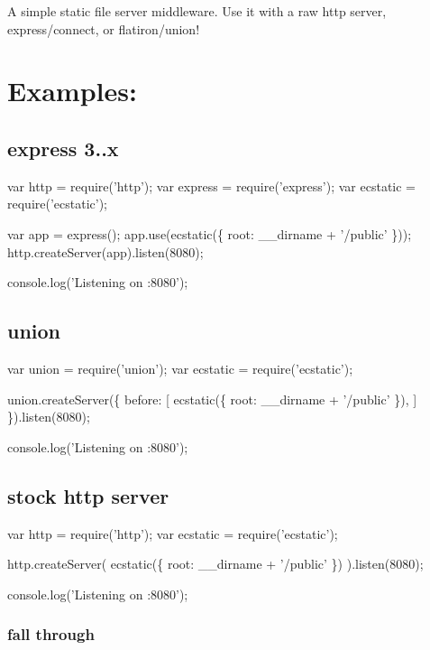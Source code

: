 

A simple static file server middleware. Use it with a raw http server, express/connect, or flatiron/union!

\section*{Examples\+:}

\subsection*{express 3..\+x}


\begin{DoxyCode}
var http = require('http');
var express = require('express');
var ecstatic = require('ecstatic');

var app = express();
app.use(ecstatic(\{ root: \_\_dirname + '/public' \}));
http.createServer(app).listen(8080);

console.log('Listening on :8080');
\end{DoxyCode}


\subsection*{union}


\begin{DoxyCode}
var union = require('union');
var ecstatic = require('ecstatic');

union.createServer(\{
  before: [
    ecstatic(\{ root: \_\_dirname + '/public' \}),
  ]
\}).listen(8080);

console.log('Listening on :8080');
\end{DoxyCode}


\subsection*{stock http server}


\begin{DoxyCode}
var http = require('http');
var ecstatic = require('ecstatic');

http.createServer(
  ecstatic(\{ root: \_\_dirname + '/public' \})
).listen(8080);

console.log('Listening on :8080');
\end{DoxyCode}
 \subsubsection*{fall through}

